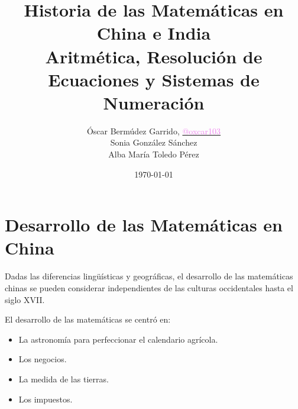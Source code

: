 \documentclass[12pt, aspectratio=169]{beamer} %
\title[Historia de las Matemáticas en China e India]{\Large Historia de las Matemáticas en China e India\\
\normalsize Aritmética, Resolución de Ecuaciones y Sistemas de Numeración} %
\author[Óscar Bermúdez, Sonia González, Alba Mª Toledo]{
	Óscar Bermúdez Garrido, \href{http://www.github.com/oxcar103}{\textcolor{violet}{@oxcar103}}\\
	Sonia González Sánchez \\
	Alba María Toledo Pérez
} %
\institute[UGR] %
{
  Universidad de Granada \\ %
}
\date{\today} %
\begin{document}
\begin{frame}
	\titlepage %
\end{frame}


 


\section{Desarrollo de las Matemáticas en China}
	\begin{frame}
		Dadas las diferencias lingüísticas y geográficas, el desarrollo de las matemáticas chinas se pueden considerar
		independientes de las culturas occidentales hasta el siglo XVII.
		
		\pause
		
		El desarrollo de las matemáticas se centró en:
		\begin{itemize}
			\item La astronomía para perfeccionar el calendario agrícola.
			\item Los negocios.
			\item La medida de las tierras.
			\item Los impuestos.
		\end{itemize}
	\end{frame}
\end{document}
